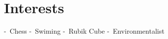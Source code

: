 \documentclass[11pt,a4paper,sans]{moderncv} %
\begin{document}


\section{Interests}

\renewcommand{\listitemsymbol}{-~} %

{\listitemsymbol}{Chess}
{\listitemsymbol}{Swiming}
{\listitemsymbol}{Rubik Cube}
{\listitemsymbol}{Environmentalist}



%
%
%
%

\end{document}

